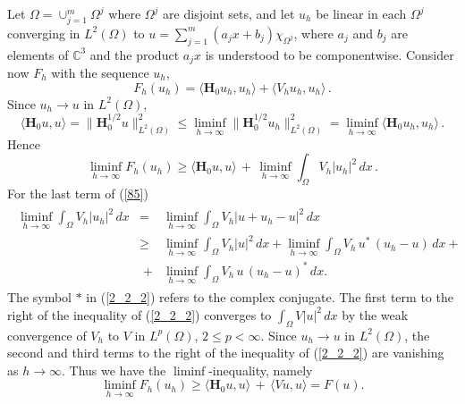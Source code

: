 \documentclass[11pt, epsf]{amsart}
\begin{document}
Let $\Omega=\cup_{j=1}^m \Omega^{j}$ where $\Omega^{j}$ are disjoint sets, and let $u_h$ be linear in each $\Omega^{j}$ converging in $L^2(\Omega)$ to $u=\displaystyle\sum_{j=1}^m (a_jx+b_j)\chi_{\Omega^{j}}$, where $a_j$ and $b_j$ are elements of $\mathbb{C}^3$ and the product $a_jx$ is understood to be componentwise. Consider now $F_h$ with the sequence $u_h$,
\begin{equation}\label{83}
F_h(u_h)=\langle\mathbf{H}_0u_h,u_h\rangle + \langle V_hu_h,u_h\rangle\,.
\end{equation}
Since $u_h\to u$ in $L^2(\Omega)$,
\begin{equation}\label{84}
\langle\mathbf{H}_0u,u\rangle=\|\mathbf{H}^{1/2}_0u\|^2_{L^2(\Omega)}\leq\displaystyle \liminf_{h\to\infty} \|\mathbf{H}^{1/2}_0u_h\|^2_{L^2(\Omega)}=\displaystyle \liminf_{h\to\infty}\langle\mathbf{H}_0u_h,u_h \rangle\,.
\end{equation}
Hence
\begin{equation}\label{85}
\displaystyle\liminf_{h\to\infty}F_h(u_h)\geq \langle\mathbf{H}_0u,u\rangle\,+\,\displaystyle\liminf_{h\to\infty}\int_{\Omega}V_h|u_h|^2\,dx\,.
\end{equation}
For the last term of (\ref{85})
\begin{eqnarray}\label{2_2_2}
\begin{array}{lll}
\displaystyle\liminf_{h\to\infty}\displaystyle \int_{\Omega}V_h|u_h|^2\,dx & \!\!\!=&\!\!\!\!\!\!\!\!\!\displaystyle\liminf_{h\to\infty} \displaystyle\int_{\Omega} V_h|u+u_h-u|^2\,dx\\
&\!\!\!\geq&\!\!\!\!\!\!\!\displaystyle\liminf_{h\to\infty}\displaystyle \int_{\Omega}\!\!V_h|u|^2\,dx+\displaystyle \liminf_{h\to\infty}\displaystyle \int_{\Omega}\!\!V_h\,u^*\,(u_h-u)\,dx+\\
&\;+&\!\!\!\displaystyle\liminf_{h\to\infty}\displaystyle \int_{\Omega}\!\!V_h\,u\,(u_h-u)^*\,dx.
\end{array}
\end{eqnarray}
The symbol $*$ in (\ref{2_2_2}) refers to the complex conjugate. The first term to the right of the inequality of (\ref{2_2_2}) converges to $\displaystyle\int_{\Omega}V|u|^2\,dx$ by the weak convergence of $V_h$ to $V$ in $L^p(\Omega)$, $2\leq p<\infty$. Since $u_h\to u$ in $L^2(\Omega)$, the second and third terms to the right of the inequality of (\ref{2_2_2}) are vanishing as $h\to\infty$. Thus we have the $\liminf$-inequality, namely
\begin{equation}\label{86}
\displaystyle\liminf_{h\to\infty}F_h(u_h)\geq \langle\mathbf{H}_0u,u\rangle\,+\,\langle Vu,u\rangle=F(u).
\end{equation}
\end{document}
